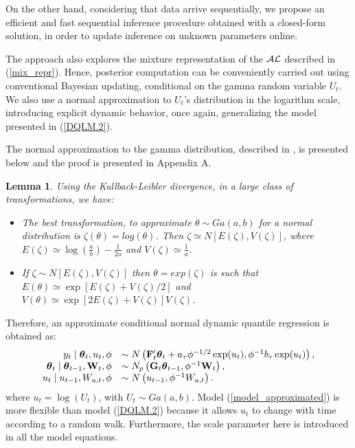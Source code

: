\documentclass[12pt,a4paper]{article}\usepackage[]{graphicx}\usepackage[]{color}\usepackage{subfigure}
\newtheorem{myle}{Lemma}[section]
\newcommand{\bftheta}{\boldsymbol{\theta}}
\begin{document}
On the other hand, considering that data arrive sequentially, we propose an efficient and fast sequential inference procedure obtained with a closed-form solution, 
in order to update inference on unknown parameters online.

The approach also explores the mixture representation of the $\cal{AL}$ described in (\ref{mix_repr}). 
Hence, posterior computation can be conveniently carried out using conventional Bayesian updating, conditional on the gamma random variable  $U_t$. 
We also use a normal approximation to $U_t$'s distribution in the logarithm scale, introducing explicit dynamic behavior, once again, generalizing the model presented 
in (\ref{DQLM.2}).

The normal approximation to the gamma distribution, described in \cite{bernardo1981bioestadistica}, is presented below and the proof is presented in Appendix A.
\begin{myle}\label{best_lemma} 
Using the Kullback-Leibler divergence, in a large class of transformations, we have:  
\begin{itemize}
\item[(i)] The best transformation, to approximate $\theta \sim Ga(a,b)$  for a normal distribution is
$\zeta(\theta) = log(\theta)$. Then $ \zeta \simeq N[E(\zeta), V(\zeta)]$,  where
$E(\zeta) \simeq \log\left(\frac{a}{b}\right) -\frac{1}{2a}$  and  $V(\zeta) \simeq \frac{1}{a}$.

\item[(ii)] If  $\zeta \sim N[E(\zeta), V(\zeta)]$  then  $\theta= exp(\zeta) $ is such that  $E(\theta) \simeq \exp\left[E(\zeta)+V(\zeta)/2\right]$ and 
$V(\theta)  \simeq \exp\left[2 E(\zeta)+V(\zeta)\right] V(\zeta)$.
\end{itemize}
 \end{myle}

Therefore, an approximate conditional normal dynamic quantile regression is obtained as:
\begin{align}\label{model_approximated}
\begin{array}{rl}
y_t\mid \bftheta_t,u_t,\phi  &\sim N\left({\bf F}_t'\bftheta_t + a_{\tau}\phi^{-1/2} \exp(u_t), \phi^{-1}b_\tau \exp(u_t) \right),\\
\bftheta_t\mid \bftheta_{t-1},{\bf W}_t, \phi & \sim N_p \left ( {\bf G}_t\bftheta_{t-1}, \phi^{-1} {\bf W}_t\right),\\
u_t\mid u_{t-1}, W_{u,t},\phi  &\sim N\left( u_{t-1}, \phi^{-1}W_{u,t} \right).
\end{array} 
\end{align}
where $u_t=\log(U_t)$, with $U_t\sim Ga(a,b)$. Model (\ref{model_approximated}) is more flexible than model (\ref{DQLM.2})
because it allows $u_t$ to change with time according to a random walk. Furthermore, the scale parameter here is introduced in all
the model equations.
\end{document}

